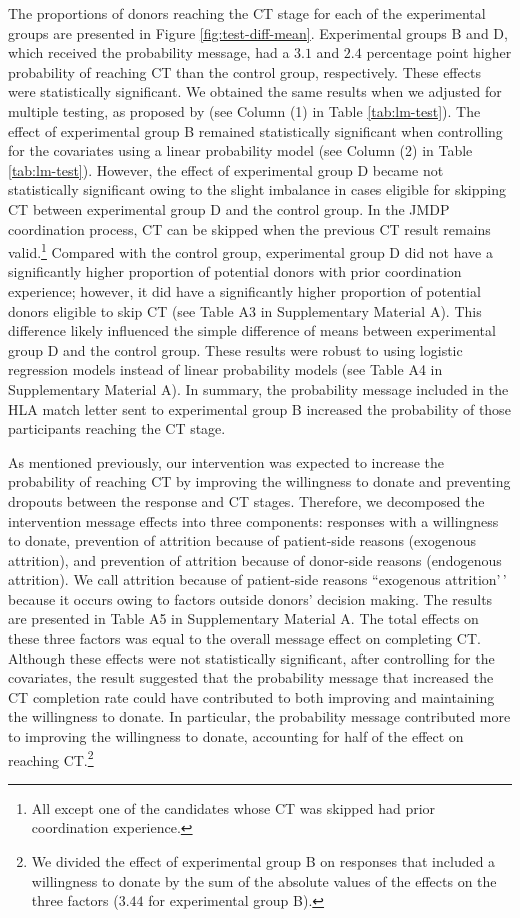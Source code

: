 \documentclass[12pt, a4paper]{article}
\begin{document}
The proportions of donors reaching the CT stage for each of the experimental groups are presented in Figure \ref{fig:test-diff-mean}. Experimental groups B and D, which received the probability message, had a \(3.1\) and \(2.4\) percentage point higher probability of reaching CT than the control group, respectively. These effects were statistically significant. We obtained the same results when we adjusted for multiple testing, as proposed by \citet{List2019} (see Column (1) in Table \ref{tab:lm-test}). The effect of experimental group B remained statistically significant when controlling for the covariates using a linear probability model (see Column (2) in Table \ref{tab:lm-test}). However, the effect of experimental group D became not statistically significant owing to the slight imbalance in cases eligible for skipping CT between experimental group D and the control group. In the JMDP coordination process, CT can be skipped when the previous CT result remains valid.\footnote{All except one of the candidates whose CT was skipped had prior coordination experience.} Compared with the control group, experimental group D did not have a significantly higher proportion of potential donors with prior coordination experience; however, it did have a significantly higher proportion of potential donors eligible to skip CT (see Table A3 in Supplementary Material A). This difference likely influenced the simple difference of means between experimental group D and the control group. These results were robust to using logistic regression models instead of linear probability models (see Table A4 in Supplementary Material A). In summary, the probability message included in the HLA match letter sent to experimental group B increased the probability of those participants reaching the CT stage.

As mentioned previously, our intervention was expected to increase the probability of reaching CT by improving the willingness to donate and preventing dropouts between the response and CT stages. Therefore, we decomposed the intervention message effects into three components: responses with a willingness to donate, prevention of attrition because of patient-side reasons (exogenous attrition), and prevention of attrition because of donor-side reasons (endogenous attrition). We call attrition because of patient-side reasons ``exogenous attrition'\,' because it occurs owing to factors outside donors' decision making. The results are presented in Table A5 in Supplementary Material A. The total effects on these three factors was equal to the overall message effect on completing CT. Although these effects were not statistically significant, after controlling for the covariates, the result suggested that the probability message that increased the CT completion rate could have contributed to both improving and maintaining the willingness to donate. In particular, the probability message contributed more to improving the willingness to donate, accounting for half of the effect on reaching CT.\footnote{We divided the effect of experimental group B on responses that included a willingness to donate by the sum of the absolute values of the effects on the three factors (\(3.44\) for experimental group B).}
\end{document}

